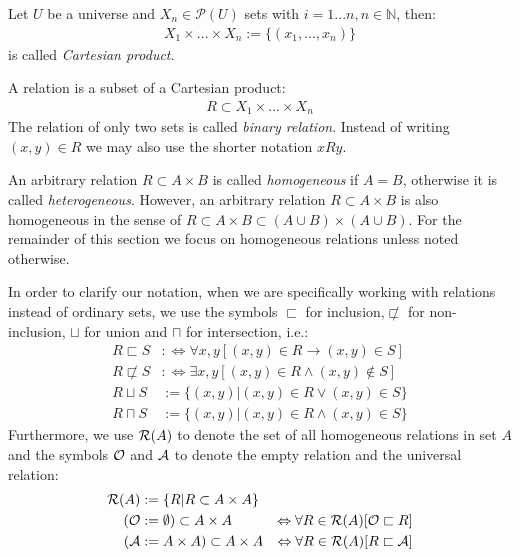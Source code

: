 \begin{definition}
Let $U$ be a universe and $X_n \in \mathcal{P}(U)$ sets with $ i=1...n, n \in \mathbb{N}$, then:
\begin{align}
X_1 \times ... \times X_n := \{ (x_1,..., x_n) \}
\end{align} 
is called \emph{Cartesian product}.
\end{definition}

\begin{definition}[Relation]
A relation is a subset of a Cartesian product:
\begin{align}
R \subset X_1 \times ... \times X_n 
\end{align}
The relation of only two sets is called \emph{binary relation}.
Instead of writing $(x,y) \in R$ we may also use the shorter notation $xRy$.
\end{definition}

An arbitrary relation $R \subset A \times B$ is called \emph{homogeneous} if $A = B$, otherwise it is called \emph{heterogeneous}.
However, an arbitrary relation $R \subset A \times B$ is also homogeneous in the sense of
$R \subset A \times B \subset (A \cup B) \times (A \cup B)$.
For the remainder of this section we focus on homogeneous relations unless noted otherwise.

In order to clarify our notation, when we are specifically working with relations instead of ordinary sets, we use the symbols
$\sqsubset$ for inclusion,$\not\sqsubset$ for non-inclusion, $\sqcup$ for union and $\sqcap$ for intersection, i.e.:
\begin{align}
R \sqsubset S
&:\Leftrightarrow
\forall x,y [(x,y) \in R \rightarrow (x,y) \in S]
\\
R \not\sqsubset S
&:\Leftrightarrow
\exists x,y [(x,y) \in R \wedge (x,y) \not\in S]
\\
R \sqcup S
&:=
\{ (x,y) | (x,y) \in R \vee (x,y) \in S \}
\\
R \sqcap S
&:=
\{ (x,y) | (x,y) \in R \wedge (x,y) \in S \}
\end{align}
Furthermore, we use $\mathcal{R}(A)$ to denote the set of all homogeneous relations in set $A$ and the symbols $\mathcal{O}$ and $\mathcal{A}$ to denote the empty relation and the universal relation:
\begin{align}
\mathcal{R}(A) 
&:= \{ R | R \subset A \times A \}
\\
(\mathcal{O} &:= \emptyset) \subset A \times A
&\Leftrightarrow
\forall R \in \mathcal{R}(A) [ \mathcal{O} \sqsubset R ]
\\
(\mathcal{A} &:= A \times A) \subset A \times A
&\Leftrightarrow
\forall R \in \mathcal{R}(A) [ R \sqsubset \mathcal{A} ]
\end{align}

